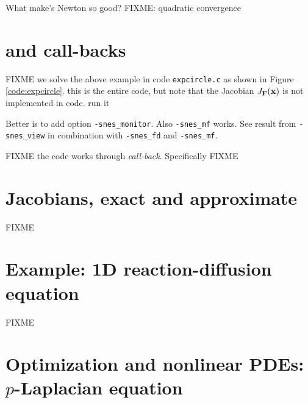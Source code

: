 What make's Newton so good?  FIXME: quadratic convergence


\section{\pSNES and call-backs}

FIXME  we solve the above example in code \texttt{expcircle.c} as shown in Figure \ref{code:expcircle}.  this is the entire code, but note that the Jacobian $J_{\mathbf{F}}(\mathbf{x})$ is not implemented in code.  run it
Better is to add option \texttt{-snes\_monitor}.  Also \texttt{-snes\_mf} works.  See result from \texttt{-snes\_view} in combination with \texttt{-snes\_fd} and \texttt{-snes\_mf}.

FIXME the code works through \emph{call-back}.  Specifically FIXME

\vfill
{}


\section{Jacobians, exact and approximate}

FIXME

\vfill
{}



\section{Example: 1D reaction-diffusion equation}

FIXME

\vfill
{}




\section{Optimization and nonlinear PDEs: $p$-Laplacian equation}

